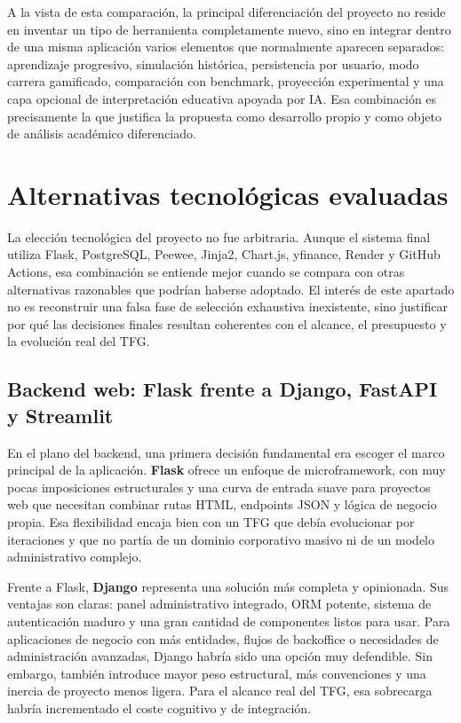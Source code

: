A la vista de esta comparación, la principal diferenciación del proyecto no reside en inventar un tipo de herramienta completamente nuevo, sino en integrar dentro de una misma aplicación varios elementos que normalmente aparecen separados: aprendizaje progresivo, simulación histórica, persistencia por usuario, modo carrera gamificado, comparación con benchmark, proyección experimental y una capa opcional de interpretación educativa apoyada por IA. Esa combinación es precisamente la que justifica la propuesta como desarrollo propio y como objeto de análisis académico diferenciado.

\section{Alternativas tecnológicas evaluadas}

La elección tecnológica del proyecto no fue arbitraria. Aunque el sistema final utiliza Flask, PostgreSQL, Peewee, Jinja2, Chart.js, yfinance, Render y GitHub Actions, esa combinación se entiende mejor cuando se compara con otras alternativas razonables que podrían haberse adoptado. El interés de este apartado no es reconstruir una falsa fase de selección exhaustiva inexistente, sino justificar por qué las decisiones finales resultan coherentes con el alcance, el presupuesto y la evolución real del TFG.

\subsection{Backend web: Flask frente a Django, FastAPI y Streamlit}

En el plano del backend, una primera decisión fundamental era escoger el marco principal de la aplicación. \textbf{Flask} \cite{flask} ofrece un enfoque de microframework, con muy pocas imposiciones estructurales y una curva de entrada suave para proyectos web que necesitan combinar rutas HTML, endpoints JSON y lógica de negocio propia. Esa flexibilidad encaja bien con un TFG que debía evolucionar por iteraciones y que no partía de un dominio corporativo masivo ni de un modelo administrativo complejo.

Frente a Flask, \textbf{Django} \cite{django} representa una solución más completa y opinionada. Sus ventajas son claras: panel administrativo integrado, ORM potente, sistema de autenticación maduro y una gran cantidad de componentes listos para usar. Para aplicaciones de negocio con más entidades, flujos de backoffice o necesidades de administración avanzadas, Django habría sido una opción muy defendible. Sin embargo, también introduce mayor peso estructural, más convenciones y una inercia de proyecto menos ligera. Para el alcance real del TFG, esa sobrecarga habría incrementado el coste cognitivo y de integración.

